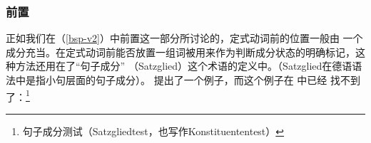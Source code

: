 \subsubsection{前置}
\label{sec-konst-test-probleme-voranstellung} 
正如我们在（\ref{bsp-v2}）中前置这一部分所讨论的，定式动词前的位置一般由
一个成分充当。在定式动词前能否放置一组词被用来作为判断成分状态的明确标记，这种方法还用在了“句子成分”
（Satzglied）这个术语的定义中。（Satzglied在德语语法中是指小句层面的句子成分）\citep[]{Duden2005-Authors}。 提出了一个例子，而这个例子在 中已经
找不到了：\footnote{%
句子成分测试（Satzgliedtest，也写作Konstituententest）}
